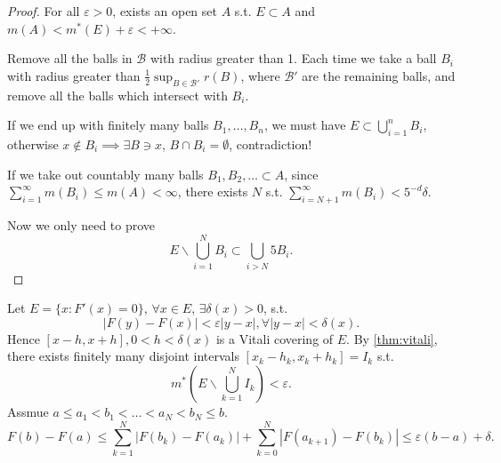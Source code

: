 \begin{proof}[Proof]
    For all $\varepsilon > 0$, exists an open set $A$ s.t. $E \subset A$
	and $m(A)<m^*(E) + \varepsilon < + \infty$.

	Remove all the balls in $\mathcal{B}$ with radius greater than 1.
	Each time we take a ball $B_i$ with radius greater
	than $\frac{1}{2}\sup_{B\in \mathcal{B}'} r(B)$, where $\mathcal{B}'$ are
	the remaining balls, and remove all the balls which intersect with $B_i$.

	If we end up with finitely many balls  $B_1,\dots,B_n$, we must
	have $E \subset \bigcup_{i=1}^n B_i$, otherwise $x\notin B_i\implies \exists B\ni x$,
	$B\cap B_i = \emptyset$, contradiction!

	If we take out countably many balls $B_1,B_2,\dots \subset A$,
	since $ \sum_{i=1}^{\infty} m(B_i) \le m(A) <\infty$,
	there exists $N$ s.t. $ \sum_{i=N+1}^{\infty} m(B_i) < 5^{-d}\delta$.

	Now we only need to prove
	\[
		E\backslash \bigcup_{i=1}^N B_i \subset \bigcup_{i>N}5B_i.
	\]
\end{proof}

Let $E = \{x: F'(x) = 0\}$, $\forall x\in E$, $\exists \delta(x)>0$, s.t.
\[
|F(y) - F(x)| < \varepsilon |y - x|, \forall |y-x| < \delta(x).
\]
Hence $[x-h, x+h], 0<h<\delta(x)$ is a Vitali covering of $E$.
By \autoref{thm:vitali},
there exists finitely many disjoint intervals $[x_k-h_k,x_k+h_k]=I_k$ s.t.
\[
m^*(E\backslash\bigcup_{k=1}^N I_k) < \varepsilon.
\]
Assmue $a\le a_1<b_1<\dots<a_N<b_N\le b$.
\[
F(b) - F(a) \le \sum_{k=1}^{N} |F(b_k)-F(a_k)| + \sum_{k=0}^{N}|F(a_{k+1})-F(b_k)|
\le \varepsilon(b-a) + \delta.
\]

